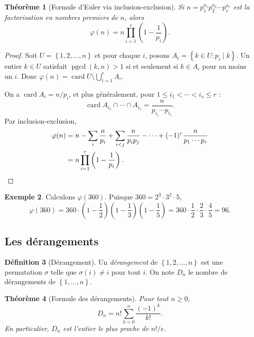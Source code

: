 \documentclass[12pt,a4paper,openany]{book}
\theoremstyle{definition}
\newtheorem{definition}{Définition}[chapter]
\newtheorem{exemple}[definition]{Exemple}
\theoremstyle{plain}
\newtheorem{theoreme}[definition]{Théorème}
\theoremstyle{remark}
\newcommand{\set}[1]{\left\{#1\right\}}
\DeclareMathOperator{\card}{card}
\DeclareMathOperator{\pgcd}{pgcd}
\begin{document}
\begin{theoreme}[Formule d'Euler via inclusion-exclusion]
\label{thm:euler-ie}
Si $n = p_1^{a_1} p_2^{a_2} \cdots p_r^{a_r}$ est la factorisation en nombres
premiers de $n$, alors
\[
  \varphi(n) = n \prod_{i=1}^{r} \left(1 - \frac{1}{p_i}\right).
\]
\end{theoreme}

\begin{proof}
Soit $U = \set{1, 2, \dots, n}$ et pour chaque $i$, posons
$A_i = \set{k \in U : p_i \mid k}$. Un entier $k \in U$ satisfait
$\pgcd(k,n) > 1$ si et seulement si $k \in A_i$ pour au moins un $i$.
Donc $\varphi(n) = \card{U \setminus \bigcup_{i=1}^r A_i}$.

On a $\card{A_i} = n/p_i$, et plus généralement, pour
$1 \leqslant i_1 < \cdots < i_s \leqslant r$ :
\[
  \card{A_{i_1} \cap \cdots \cap A_{i_s}} = \frac{n}{p_{i_1} \cdots p_{i_s}}.
\]
Par inclusion-exclusion,
\begin{align*}
  \varphi(n) &= n - \sum_i \frac{n}{p_i} + \sum_{i<j} \frac{n}{p_i p_j}
    - \cdots + (-1)^r \frac{n}{p_1 \cdots p_r} \\
  &= n \prod_{i=1}^{r} \left(1 - \frac{1}{p_i}\right).
  \qedhere
\end{align*}
\end{proof}

\begin{exemple}
\label{ex:euler-360}
Calculons $\varphi(360)$. Puisque $360 = 2^3 \cdot 3^2 \cdot 5$,
\[
  \varphi(360) = 360 \cdot \left(1 - \frac{1}{2}\right)
    \left(1 - \frac{1}{3}\right)\left(1 - \frac{1}{5}\right)
  = 360 \cdot \frac{1}{2} \cdot \frac{2}{3} \cdot \frac{4}{5} = 96.
\]
\end{exemple}

\subsection{Les dérangements}
\label{sec:derangements}

\begin{definition}[Dérangement]
\label{def:derangement}
Un \emph{dérangement} de $\set{1, 2, \dots, n}$ est une permutation $\sigma$
telle que $\sigma(i) \neq i$ pour tout $i$. On note $D_n$
le nombre de dérangements de $\set{1, \dots, n}$.
\end{definition}

\begin{theoreme}[Formule des dérangements]
\label{thm:derangements}
Pour tout $n \geqslant 0$,
\[
  D_n = n! \sum_{k=0}^{n} \frac{(-1)^k}{k!}.
\]
En particulier, $D_n$ est l'entier le plus proche de $n!/e$.
\end{theoreme}
\end{document}
